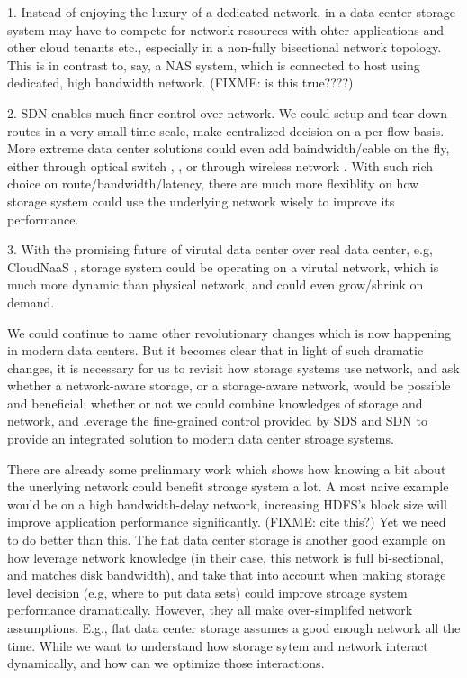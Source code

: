 \item{
}

1. Instead of enjoying the luxury of a dedicated network, in a data center storage system may have to compete for network resources with ohter applications and other cloud tenants etc., especially in a non-fully bisectional network topology. This is in contrast to, say, a NAS system, which is connected to host using dedicated, high bandwidth network. (FIXME: is this true????)

2. SDN enables much finer control over network. We could setup and tear down routes in a very small time scale, make centralized decision on a per flow basis. More extreme data center solutions could even add baindwidth/cable on the fly, either through optical switch \cite{c-through}, \cite{Hellio}, or through wireless network \cite{flyways}. With such rich choice on route/bandwidth/latency, there are much more flexiblity on how storage system could use the underlying network wisely to improve its performance.

3. With the promising future of virutal data center over real data center, e.g, CloudNaaS \cite{cloud-naas}, storage system could be operating on a virutal network, which is much more dynamic than physical network, and could even grow/shrink on demand.

We could continue to name other revolutionary changes which is now happening in modern data centers. But it becomes clear that in light of such dramatic changes, it is necessary for us to revisit how storage systems use network, and ask whether a network-aware storage, or a storage-aware network, would be possible and beneficial; whether or not we could combine knowledges of storage and network, and leverage the fine-grained control provided by SDS and SDN to provide an integrated solution to modern data center stroage systems.

There are already some prelinmary work which shows how knowing a bit about the unerlying network could benefit stroage system a lot. A most naive example would be on a high bandwidth-delay network, increasing HDFS's block size will improve application performance significantly. (FIXME: cite this?) Yet we need to do better than this. The flat data center storage \cite{fds} is another good example on how leverage network knowledge (in their case, this network is full bi-sectional, and matches disk bandwidth), and take that into account when making storage level decision (e.g, where to put data sets) could improve stroage system performance dramatically. However, they all make over-simplifed network assumptions. E.g., flat data center storage assumes a good enough network all the time. While we want to understand how storage sytem and network interact dynamically, and how can we optimize those interactions.





